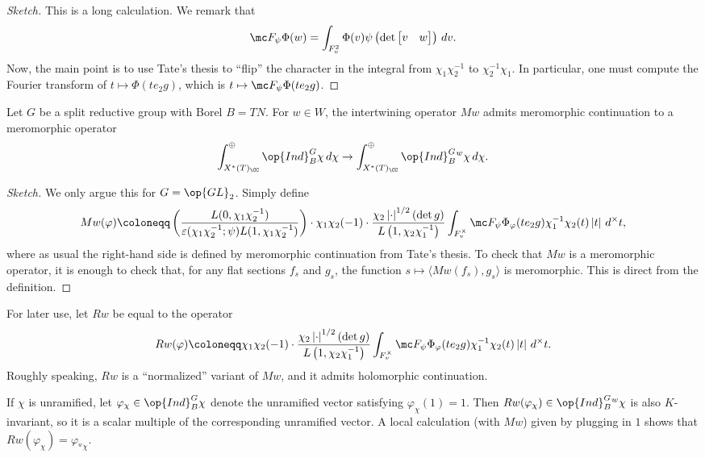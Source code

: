 \documentclass{article}
\begin{document}
\begin{proof}[Sketch]
	This is a long calculation. We remark that
	\[\mc F_\psi\Phi(w)=\int_{F_v^2}\Phi(v)\psi\left(\det\begin{bmatrix}
		v & w
	\end{bmatrix}\right)\,dv.\]
	Now, the main point is to use Tate's thesis to ``flip'' the character in the integral from $\chi_1\chi_2^{-1}$ to $\chi_2^{-1}\chi_1$. In particular, one must compute the Fourier transform of $t\mapsto\Phi(te_2g)$, which is $t\mapsto\mc F_\psi\Phi(te_2g)$.
\end{proof}
\begin{theorem}
	Let $G$ be a split reductive group with Borel $B=TN$. For $w\in W$, the intertwining operator $Mw$ admits meromorphic continuation to a meromorphic operator
	\[\int_{X^*(T)_\CC}^\oplus\op{Ind}_B^G\chi\,d\chi\to\int_{X^*(T)_\CC}^\oplus\op{Ind}_B^G{^w\chi}\,d\chi.\]
\end{theorem}
\begin{proof}[Sketch]
	We only argue this for $G=\op{GL}_2$. Simply define
	\[Mw(\varphi)\coloneqq\left(\frac{L(0,\chi_1\chi_2^{-1})}{\varepsilon(\chi_1\chi_2^{-1};\psi)L(1,\chi_1\chi_2^{-1})}\right)\cdot\chi_1\chi_2(-1)\cdot\frac{\chi_2\left|\cdot\right|^{1/2}(\det g)}{L\left(1,\chi_2\chi_1^{-1}\right)}\int_{F_v^\times}\mc F_\psi\Phi_\varphi(te_2g)\chi_1^{-1}\chi_2(t)\left|t\right|\,d^\times t,\]
	where as usual the right-hand side is defined by meromorphic continuation from Tate's thesis. To check that $Mw$ is a meromorphic operator, it is enough to check that, for any flat sections $f_s$ and $g_s$, the function $s\mapsto\langle Mw(f_s),g_s\rangle$ is meromorphic. This is direct from the definition.
\end{proof}
\begin{notation}
	For later use, let $Rw$ be equal to the operator
	\[Rw(\varphi)\coloneqq\chi_1\chi_2(-1)\cdot\frac{\chi_2\left|\cdot\right|^{1/2}(\det g)}{L\left(1,\chi_2\chi_1^{-1}\right)}\int_{F_v^\times}\mc F_\psi\Phi_\varphi(te_2g)\chi_1^{-1}\chi_2(t)\left|t\right|\,d^\times t.\]
	Roughly speaking, $Rw$ is a ``normalized'' variant of $Mw$, and it admits holomorphic continuation.
\end{notation}
\begin{example}
	If $\chi$ is unramified, let $\varphi_\chi\in\op{Ind}_B^G\chi$ denote the unramified vector satisfying $\varphi_\chi(1)=1$. Then $Rw(\varphi_\chi)\in\op{Ind}_B^G{^w\chi}$ is also $K$-invariant, so it is a scalar multiple of the corresponding unramified vector. A local calculation (with $Mw$) given by plugging in $1$ shows that $Rw(\varphi_\chi)=\varphi_{^w\chi}$.
\end{example}
\end{document}
